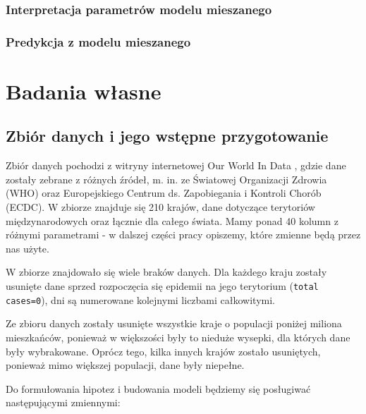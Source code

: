 \documentclass[12pt]{mwbk}
\theoremstyle{plain}
\theoremstyle{definition}
\theoremstyle{remark}
\begin{document}
\subsection{Interpretacja parametrów modelu mieszanego}
\subsection{Predykcja z modelu mieszanego}
\chapter{Badania własne}
\section{Zbiór danych i jego wstępne przygotowanie}

Zbiór danych pochodzi z witryny internetowej Our World In Data \cite{owid}, gdzie dane zostały zebrane z różnych źródeł, m. in. ze Światowej Organizacji Zdrowia (WHO) oraz Europejskiego Centrum ds. Zapobiegania i Kontroli Chorób (ECDC). W zbiorze znajduje się 210 krajów, dane dotyczące terytoriów międzynarodowych oraz łącznie dla całego świata. Mamy ponad 40 kolumn z różnymi parametrami - w dalszej części pracy opiszemy, które zmienne będą przez nas użyte.

W zbiorze znajdowało się wiele braków danych. Dla każdego kraju zostały usunięte dane sprzed rozpoczęcia się epidemii na jego terytorium (\texttt{total cases=0}), dni są numerowane kolejnymi liczbami całkowitymi.

Ze zbioru danych zostały usunięte wszystkie kraje o populacji poniżej miliona mieszkańców, ponieważ w większości były to nieduże wysepki, dla których dane były wybrakowane. Oprócz tego, kilka innych krajów zostało usuniętych, ponieważ mimo większej populacji, dane były niepełne.

Do formułowania hipotez i budowania modeli będziemy się posługiwać następującymi zmiennymi:
\end{document}
